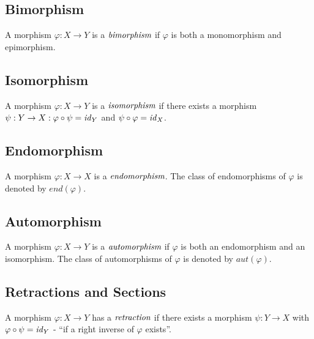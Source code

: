 \documentclass[10pt, oneside, reqno]{amsart}
\begin{document}
\subsection{Bimorphism} %
\label{subsec:bimorphism}
\begin{defn}[Bimorphism]
 A morphism $\varphi: X \to Y$ is a $\emph{bimorphism}$ if $\varphi$ is both a monomorphism and epimorphism.
\end{defn}

\subsection{Isomorphism} %
\label{subsec:isomorphism}
\begin{defn}[Isomorphism]
 A morphism $\varphi: X \to Y$ is a $\emph{isomorphism}$ if there exists a morphism $\psi: Y \to X : \varphi \circ \psi = \mathit{id}_{Y}$ and $\psi \circ \varphi = \mathit{id}_{X}$.
\end{defn}

\subsection{Endomorphism} %
\label{subsec:endomorphism}
\begin{defn}[Endomorphism]
 A morphism $\varphi: X \to X$ is a $\emph{endomorphism}$.
 The class of endomorphisms of $\varphi$ is denoted by $end(\varphi)$.
\end{defn}

\subsection{Automorphism} %
\label{subsec:automorphism}
\begin{defn}[Automorphism]
 A morphism $\varphi: X \to Y$ is a $\emph{automorphism}$ if $\varphi$ is both an endomorphism and an isomorphism.
 The class of automorphisms of $\varphi$ is denoted by $aut(\varphi)$.
\end{defn}

\subsection{Retractions and Sections} %
\label{subsec:retractionsandsections}
\begin{defn}[Retraction]
 A morphism $\varphi: X \to Y$ has a $\emph{retraction}$ if there exists a morphism $\psi: Y \to X$ with $\varphi \circ \psi = \mathit{id}_{Y}$ - ``if a right inverse of $\varphi$ exists''.
\end{defn}
\end{document}
